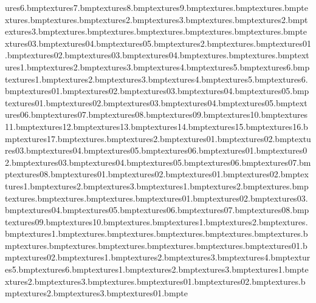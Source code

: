 ures\elechut6.bmp textures\elechut7.bmp textures\elechut8.bmp textures\elechut9.bmp textures\elecloop.bmp textures\eyetex.bmp textures\fblu.bmp textures\fence.bmp textures\fence2.bmp textures\fence3.bmp textures\fencesnow.bmp textures\fencesnow2.bmp textures\fencesnow3.bmp textures\fgre.bmp textures\flash.bmp textures\fpurp.bmp textures\fred.bmp textures\frozentreats.bmp textures\frozentreats03.bmp textures\frozentreats04.bmp textures\frozentreats05.bmp textures\frozentreats2.bmp textures\gate.bmp textures\gen01.bmp textures\gen02.bmp textures\gen03.bmp textures\gen04.bmp textures\grass.bmp textures\grasscracks.bmp textures\grassedge1.bmp textures\grassedge2.bmp textures\grassedge3.bmp textures\grassedge4.bmp textures\grassedge5.bmp textures\grassedge6.bmp textures\grassshad1.bmp textures\grassshad2.bmp textures\grassshad3.bmp textures\grassshad4.bmp textures\grassshad5.bmp textures\grassshad6.bmp textures\grasstocobble01.bmp textures\grasstocobble02.bmp textures\grasstocobble03.bmp textures\grasstocobble04.bmp textures\grasstocobble05.bmp textures\grasstosand01.bmp textures\grasstosand02.bmp textures\grasstosand03.bmp textures\grasstosand04.bmp textures\grasstosand05.bmp textures\grasstosand06.bmp textures\grasstosand07.bmp textures\grasstosand08.bmp textures\grasstosand09.bmp textures\grasstosand10.bmp textures\grasstosand11.bmp textures\grasstosand12.bmp textures\grasstosand13.bmp textures\grasstosand14.bmp textures\grasstosand15.bmp textures\grasstosand16.bmp textures\grasstosand17.bmp textures\housefloor.bmp textures\housefloor2.bmp textures\hubflowers01.bmp textures\hubflowers02.bmp textures\hubflowers03.bmp textures\hubflowers04.bmp textures\hubflowers05.bmp textures\hubflowers06.bmp textures\hubpath01.bmp textures\hubpath02.bmp textures\hubpath03.bmp textures\hubpath04.bmp textures\hubpath05.bmp textures\hubpath06.bmp textures\hubpath07.bmp textures\hubpath08.bmp textures\hubpathbrick01.bmp textures\hubpathbrick02.bmp textures\hubpathcorner01.bmp textures\hubpathcorner02.bmp textures\hubpaththin1.bmp textures\hubpaththin2.bmp textures\hubpaththin3.bmp textures\hutbrick1.bmp textures\hutbrick2.bmp textures\hutcabtowel.bmp textures\hutceiling.bmp textures\hutcooker.bmp textures\hutfloor.bmp textures\hutfood01.bmp textures\hutfood02.bmp textures\hutfood03.bmp textures\hutfood04.bmp textures\hutfood05.bmp textures\hutfood06.bmp textures\hutfood07.bmp textures\hutfood08.bmp textures\hutfood09.bmp textures\hutfood10.bmp textures\hutsign.bmp textures\hutsink1.bmp textures\hutsink2.bmp textures\hutstripes.bmp textures\hutstripes1.bmp textures\hutstripesbar.bmp textures\hutwall.bmp textures\hutwallcolours.bmp textures\hutwallpans.bmp textures\hutwallplates.bmp textures\hutwallspice.bmp textures\hutworkbread.bmp textures\hutworkbrush.bmp textures\hutworkcorner.bmp textures\hutworks.bmp textures\icecream01.bmp textures\icecream02.bmp textures\icewall1.bmp textures\icewall2.bmp textures\icewall3.bmp textures\icewall4.bmp textures\icewall5.bmp textures\icewall6.bmp textures\icewallex1.bmp textures\icewallex2.bmp textures\icewallex3.bmp textures\icewallexshine1.bmp textures\icewallexshine2.bmp textures\icewallexshine3.bmp textures\jhut.bmp textures\jhutboard01.bmp textures\jhutboard02.bmp textures\jhutbrik.bmp textures\jhutbrik2.bmp textures\jhutbrik3.bmp textures\jhutdoor01.bmp te